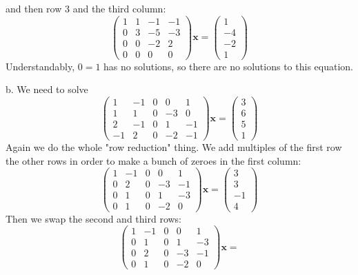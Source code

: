 \documentclass{article}
\newcommand{\chapternumber}{2}
\newenvironment{QandA}{\begin{enumerate}[label=\chapternumber.\arabic*]\bfseries\boldmath}
	{\end{enumerate}}
\newenvironment{answered}{\par\bigskip\normalfont\unboldmath}{}
\begin{document}
\begin{QandA}
\begin{answered}
			and then row 3 and the third column:
			\[\begin{pmatrix}
				1 & 1 & -1 & -1\\
				0 & 3 & -5 & -3\\
				0 & 0 & -2 & 2\\
				0 & 0 & 0 & 0
			\end{pmatrix}\textbf{x}
			=
			\begin{pmatrix}
				1\\
				-4\\
				-2\\
				1
			\end{pmatrix}\]
			Understandably, $0=1$ has no solutions, so there are no solutions to this equation.
			
			b. We need to solve
			\[\begin{pmatrix}
				1 & -1 & 0 & 0 & 1 \\
				1 & 1 & 0 & -3 & 0 \\
				2 & -1 & 0 & 1 & -1 \\
				-1 & 2 & 0 & -2 & -1
			\end{pmatrix}
			\textbf{x}=
			\begin{pmatrix}
				3\\
				6\\
				5\\
				1
			\end{pmatrix}
			\]
			Again we do the whole "row reduction" thing. We add multiples of the first row the other rows in order to make a bunch of zeroes in the first column:
			\[\begin{pmatrix}
				1 & -1 & 0 & 0 & 1 \\
				0 & 2 & 0 & -3 & -1 \\
				0 & 1 & 0 & 1 & -3 \\
				0 & 1 & 0 & -2 & 0
			\end{pmatrix}
			\textbf{x}=
			\begin{pmatrix}
				3\\
				3\\
				-1\\
				4
			\end{pmatrix}
			\]
			Then we swap the second and third rows:
			\[\begin{pmatrix}
				1 & -1 & 0 & 0 & 1 \\
				0 & 1 & 0 & 1 & -3 \\
				0 & 2 & 0 & -3 & -1 \\
				0 & 1 & 0 & -2 & 0
			\end{pmatrix}
			\textbf{x}=
\]
\end{answered}
\end{QandA}
\end{document}
